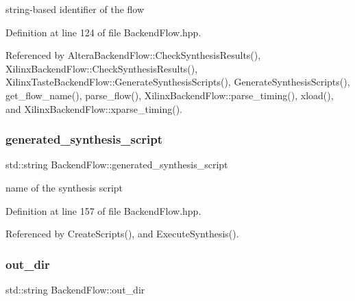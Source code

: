 string-\/based identifier of the flow 



Definition at line 124 of file Backend\+Flow.\+hpp.



Referenced by Altera\+Backend\+Flow\+::\+Check\+Synthesis\+Results(), Xilinx\+Backend\+Flow\+::\+Check\+Synthesis\+Results(), Xilinx\+Taste\+Backend\+Flow\+::\+Generate\+Synthesis\+Scripts(), Generate\+Synthesis\+Scripts(), get\+\_\+flow\+\_\+name(), parse\+\_\+flow(), Xilinx\+Backend\+Flow\+::parse\+\_\+timing(), xload(), and Xilinx\+Backend\+Flow\+::xparse\+\_\+timing().

\mbox{\label{classBackendFlow_a0be96e8ee5a80e06b2d5e1760e541fc7}} 
\subsubsection{\texorpdfstring{generated\+\_\+synthesis\+\_\+script}{generated\_synthesis\_script}}
{\footnotesize\ttfamily std\+::string Backend\+Flow\+::generated\+\_\+synthesis\+\_\+script\hspace{0.3cm}{\ttfamily [protected]}}



name of the synthesis script 



Definition at line 157 of file Backend\+Flow.\+hpp.



Referenced by Create\+Scripts(), and Execute\+Synthesis().

\mbox{\label{classBackendFlow_a109494ad00f75999dcf16fd6e346a224}} 
\subsubsection{\texorpdfstring{out\+\_\+dir}{out\_dir}}
{\footnotesize\ttfamily std\+::string Backend\+Flow\+::out\+\_\+dir\hspace{0.3cm}{\ttfamily [protected]}}



